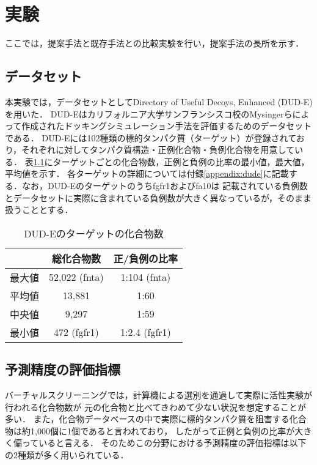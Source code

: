 \chapter{実験}
ここでは，提案手法と既存手法との比較実験を行い，提案手法の長所を示す．


\section{データセット}
本実験では，データセットとしてDirectory of Useful Decoys, Enhanced (DUD-E)\cite{Mysinger2012}を用いた．
DUD-Eはカリフォルニア大学サンフランシスコ校のMysingerらによって作成されたドッキングシミュレーション手法を評価するためのデータセットである．
DUD-Eには102種類の標的タンパク質（ターゲット）が登録されており，それぞれに対してタンパク質構造・正例化合物・負例化合物を用意している．
表\ref{table:dude}にターゲットごとの化合物数，正例と負例の比率の最小値，最大値，平均値を示す．
各ターゲットの詳細については付録\ref{appendix:dude}に記載する．なお，DUD-Eのターゲットのうちfgfr1およびfa10は
記載されている負例数とデータセットに実際に含まれている負例数が大きく異なっているが，そのまま扱うこととする．

\begin{table}[htb] \centering
	\caption{DUD-Eのターゲットの化合物数}
	\label {table:dude}
	\begin{tabular}{c|cc}
	\hline
				&総化合物数	&正/負例の比率	\\ \hline
	最大値	&52,022 (fnta)	&1:104 (fnta)			\\
	平均値	&13,881			&1:60					\\
	中央値	&9,297			&1:59					\\
	最小値	&472 (fgfr1)		&1:2.4 (fgfr1)			\\ \hline
	\end{tabular}
\end{table}

	
\section{予測精度の評価指標}
バーチャルスクリーニングでは，計算機による選別を通過して実際に活性実験が行われる化合物数が
元の化合物と比べてきわめて少ない状況を想定することが多い．
また，化合物データベースの中で実際に標的タンパク質を阻害する化合物は約1,000個に1個であると言われており，
したがって正例と負例の比率が大きく偏っていると言える．
そのためこの分野における予測精度の評価指標は以下の2種類が多く用いられている．

